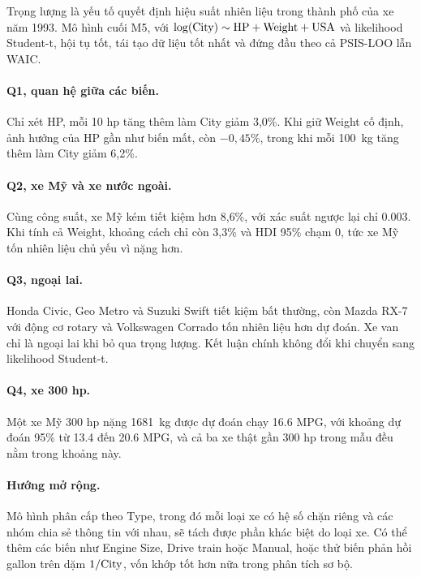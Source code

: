 \documentclass[12pt,a4paper]{report}
\renewcommand{\thechapter}{\Roman{chapter}}
\renewcommand{\thefigure}{\arabic{chapter}.\arabic{figure}}
\renewcommand{\thetable}{\arabic{chapter}.\arabic{table}}
\begin{document}
Trọng lượng là yếu tố quyết định hiệu suất nhiên liệu trong thành phố của xe năm
1993. Mô hình cuối M5, với $\log(\mathrm{City}) \sim \mathrm{HP} + \mathrm{Weight} + \mathrm{USA}$ và likelihood
Student-t, hội tụ tốt, tái tạo dữ liệu tốt nhất và đứng đầu theo cả PSIS-LOO lẫn
WAIC.

\paragraph{Q1, quan hệ giữa các biến.} Chỉ xét HP, mỗi 10 hp tăng thêm làm City
giảm 3{,}0\%. Khi giữ Weight cố định, ảnh hưởng của HP gần như biến mất, còn
$-0{,}45\%$, trong khi mỗi \SI{100}{kg} tăng thêm làm City giảm 6{,}2\%.

\paragraph{Q2, xe Mỹ và xe nước ngoài.} Cùng công suất, xe Mỹ kém tiết kiệm hơn
8{,}6\%, với xác suất ngược lại chỉ \num{0.003}. Khi tính cả Weight, khoảng cách
chỉ còn 3{,}3\% và HDI 95\% chạm 0, tức xe Mỹ tốn nhiên liệu chủ yếu vì nặng hơn.

\paragraph{Q3, ngoại lai.} Honda Civic, Geo Metro và Suzuki Swift tiết kiệm bất
thường, còn Mazda RX-7 với động cơ rotary và Volkswagen Corrado tốn nhiên liệu
hơn dự đoán. Xe van chỉ là ngoại lai khi bỏ qua trọng lượng. Kết luận chính
không đổi khi chuyển sang likelihood Student-t.

\paragraph{Q4, xe 300 hp.} Một xe Mỹ 300 hp nặng \SI{1681}{kg} được dự đoán chạy
\num{16.6} MPG, với khoảng dự đoán 95\% từ \num{13.4} đến \num{20.6} MPG, và cả
ba xe thật gần 300 hp trong mẫu đều nằm trong khoảng này.

\paragraph{Hướng mở rộng.} Mô hình phân cấp theo Type, trong đó mỗi loại xe có
hệ số chặn riêng và các nhóm chia sẻ thông tin với nhau, sẽ tách được phần khác
biệt do loại xe. Có thể thêm các biến như Engine Size, Drive train hoặc Manual,
hoặc thử biến phản hồi gallon trên dặm $1/\mathrm{City}$, vốn khớp tốt hơn nữa trong
phân tích sơ bộ.

\appendix
\renewcommand{\thechapter}{\Alph{chapter}}
\renewcommand{\thetable}{\Alph{chapter}.\arabic{table}}
\renewcommand{\thefigure}{\Alph{chapter}.\arabic{figure}}
\end{document}
